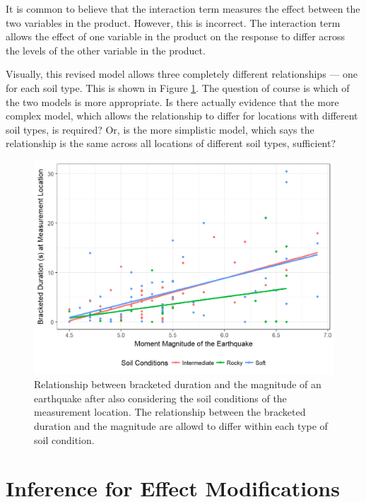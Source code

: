 \documentclass[]{book}
\theoremstyle{definition}
\theoremstyle{definition}
\theoremstyle{definition}
\theoremstyle{remark}
\let\BeginKnitrBlock\begin \let\EndKnitrBlock\end
\begin{document}
\BeginKnitrBlock{rmdtip}
It is common to believe that the interaction term measures the effect
between the two variables in the product. However, this is incorrect.
The interaction term allows the effect of one variable in the product on
the response to differ across the levels of the other variable in the
product.
\EndKnitrBlock{rmdtip}

Visually, this revised model allows three completely different
relationships --- one for each soil type. This is shown in Figure
\ref{fig:reginteractions-plot}. The question of course is which of the
two models is more appropriate. Is there actually evidence that the more
complex model, which allows the relationship to differ for locations
with different soil types, is required? Or, is the more simplistic
model, which says the relationship is the same across all locations of
different soil types, sufficient?

\begin{figure}

{\centering \includegraphics[width=0.8\linewidth]{./Images/reginteractions-plot-1} 

}

\caption{Relationship between bracketed duration and the magnitude of an earthquake after also considering the soil conditions of the measurement location.  The relationship between the bracketed duration and the magnitude are allowd to differ within each type of soil condition.}\label{fig:reginteractions-plot}
\end{figure}

\section{Inference for Effect
Modifications}\label{inference-for-effect-modifications}
\end{document}
